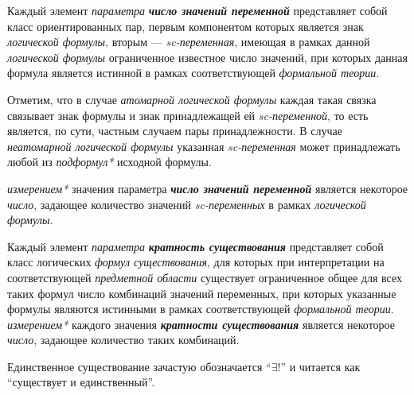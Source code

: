 Каждый элемент \textit{параметра} \textbf{\textit{число значений переменной}} представляет собой класс ориентированных пар, первым компонентом которых является знак \textit{логической формулы}, вторым --- \textit{sc-переменная}, имеющая в рамках данной \textit{логической формулы} ограниченное известное число значений, при которых данная формула является истинной в рамках соответствующей \textit{формальной теории}.

Отметим, что в случае \textit{атомарной логической формулы} каждая такая связка связывает знак формулы и знак принадлежащей ей \textit{sc-переменной}, то есть является, по сути, частным случаем пары принадлежности. В случае \textit{неатомарной логической формулы} указанная \textit{sc-переменная} может принадлежать любой из \textit{подформул*} исходной формулы.

\textit{измерением*} значения параметра \textbf{\textit{число значений переменной}} является некоторое \textit{число}, задающее количество значений \textit{sc-переменных} в рамках \textit{логической формулы}.

\begin{SCn}
\end{SCn}

Каждый элемент \textit{параметра} \textbf{\textit{кратность существования}} представляет собой класс логических \textit{формул существования}, для которых  при интерпретации на соответствующей \textit{предметной области} существует ограниченное общее для всех таких формул число комбинаций значений переменных, при которых указанные формулы являются истинными в рамках соответствующей \textit{формальной теории}.
\textit{измерением*} каждого значения \textbf{\textit{кратности существования}} является некоторое \textit{число}, задающее количество таких комбинаций.

\begin{SCn}
\end{SCn}

Единственное существование зачастую обозначается ``$\exists!$'' и читается как ``существует и единственный''.

\begin{SCn}
\end{SCn}

